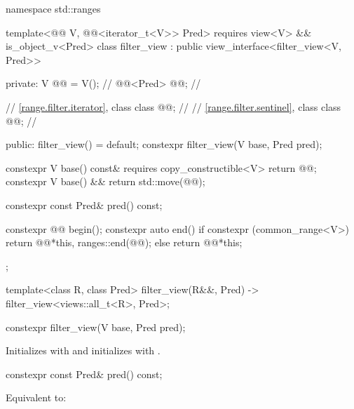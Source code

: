 %
%
%
\begin{codeblock}
namespace std::ranges {
  template<@@ V, @@<iterator_t<V>> Pred>
    requires view<V> && is_object_v<Pred>
  class filter_view : public view_interface<filter_view<V, Pred>> {
  private:
    V @@ = V();                      // \expos
    @@<Pred> @@;  // \expos

    // \ref{range.filter.iterator}, class 
    class @@;                     // \expos
    // \ref{range.filter.sentinel}, class 
    class @@;                     // \expos

  public:
    filter_view() = default;
    constexpr filter_view(V base, Pred pred);

    constexpr V base() const& requires copy_constructible<V> { return @@; }
    constexpr V base() && { return std::move(@@); }

    constexpr const Pred& pred() const;

    constexpr @@ begin();
    constexpr auto end() {
      if constexpr (common_range<V>)
        return @@{*this, ranges::end(@@)};
      else
        return @@{*this};
    }
  };

  template<class R, class Pred>
    filter_view(R&&, Pred) -> filter_view<views::all_t<R>, Pred>;
}
\end{codeblock}

%
\begin{itemdecl}
constexpr filter_view(V base, Pred pred);
\end{itemdecl}

\begin{itemdescr}
\pnum
\effects
Initializes  with  and initializes
 with .
\end{itemdescr}

%
\begin{itemdecl}
constexpr const Pred& pred() const;
\end{itemdecl}

\begin{itemdescr}
\pnum
\effects
Equivalent to: 
\end{itemdescr}

